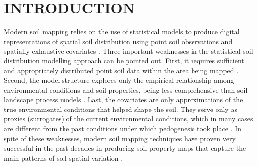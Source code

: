 \formatchapter

\section{INTRODUCTION}
\label{sec:chap05-intro}


Modern soil mapping relies on the use of statistical models to produce digital representations of spatial 
soil distribution using point soil observations and spatially exhaustive covariates \cite{McBratneyEtAl2003, 
ScullEtAl2003, Florinsky2012}. Three important weaknesses in the statistical soil distribution modelling 
approach can be pointed out. First, it requires sufficient and appropriately distributed point soil data within 
the area being mapped \cite{CarreEtAl2007a}. Second, the model structure explores only the empirical 
relationship among environmental conditions and soil properties, being less comprehensive than soil-landscape 
process models \cite{Grunwald2009}. Last, the covariates are only approximations of the true environmental 
conditions that helped shape the soil. They serve only as proxies (surrogates) of the current environmental 
conditions, which in many cases are different from the past conditions under which pedogenesis took place 
\cite{HeuvelinkEtAl2001}. In spite of these weaknesses, modern soil mapping techniques have proven very 
successful in the past decades in producing soil property maps that capture the main patterns of soil spatial 
variation \cite{MooreEtAl1993, McBratneyEtAl2000, Grunwald2009}.

